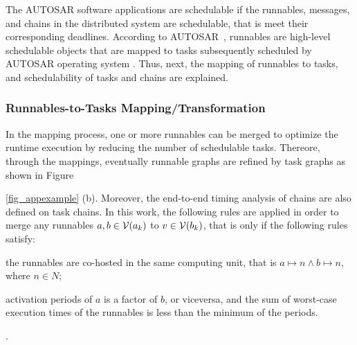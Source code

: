 {The AUTOSAR software  applications are schedulable if the runnables, messages, and chains in the distributed system are schedulable, that is meet their corresponding deadlines. According to AUTOSAR~\cite{AUTOSAR2017SpecificationSoftware}, runnables are high-level schedulable objects that are mapped to tasks subsequently scheduled by AUTOSAR operating system \cite{bibid}. Thus, next, the mapping of runnables to tasks, and  schedulability of tasks and chains are explained.

\subsubsection{Runnables-to-Tasks Mapping/Transformation}\label{subsec_runnables-to-tasks}
In the mapping process, one or more runnables can be merged to optimize the runtime execution by reducing the number of schedulable tasks. Thereore, through the mappings, eventually runnable graphs are refined by task graphs as shown in Figure~{\ref{fig_appexample} (b). Moreover, the end-to-end timing analysis of chains are also defined on task chains. In this work, the following rules are applied in order to merge any runnables $a,b\in \mathcal{V}(a_{k})$ to $v\in \mathcal{V}(b_{k})$, that is only if the following rules satisfy:
\begin{enumerate*}[label=(\roman*)]
	\item the runnables are co-hosted in the same computing unit, that is $a\mapsto n \land b\mapsto n$, where $n\in N$;
	\item activation periods of $a$ is a factor of $b$, or viceversa, and the sum of worst-case execution times of the runnables is less than the minimum of the periods.
\end{enumerate*}.
	
}}
